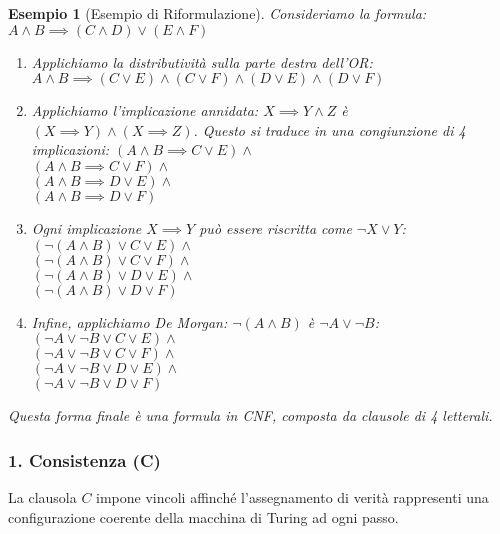 \documentclass[a4paper, 11pt]{book} %
\newtheorem{example}[theorem]{Esempio}
\theoremstyle{definition}
\begin{document}
\begin{example}[Esempio di Riformulazione]
Consideriamo la formula: $A \land B \implies (C \land D) \lor (E \land F)$
\begin{enumerate}
    \item Applichiamo la distributività sulla parte destra dell'OR:
    $A \land B \implies (C \lor E) \land (C \lor F) \land (D \lor E) \land (D \lor F)$
    \item Applichiamo l'implicazione annidata: $X \implies Y \land Z$ è $(X \implies Y) \land (X \implies Z)$.
    Questo si traduce in una congiunzione di 4 implicazioni:
    $(A \land B \implies C \lor E) \land$ \\
    $(A \land B \implies C \lor F) \land$ \\
    $(A \land B \implies D \lor E) \land$ \\
    $(A \land B \implies D \lor F)$
    \item Ogni implicazione $X \implies Y$ può essere riscritta come $\neg X \lor Y$:
    $(\neg (A \land B) \lor C \lor E) \land$ \\
    $(\neg (A \land B) \lor C \lor F) \land$ \\
    $(\neg (A \land B) \lor D \lor E) \land$ \\
    $(\neg (A \land B) \lor D \lor F)$
    \item Infine, applichiamo De Morgan: $\neg (A \land B)$ è $\neg A \lor \neg B$:
    $(\neg A \lor \neg B \lor C \lor E) \land$ \\
    $(\neg A \lor \neg B \lor C \lor F) \land$ \\
    $(\neg A \lor \neg B \lor D \lor E) \land$ \\
    $(\neg A \lor \neg B \lor D \lor F)$
\end{enumerate}
Questa forma finale è una formula in CNF, composta da clausole di 4 letterali.
\end{example}

\subsubsection{1. Consistenza (C)}
La clausola $C$ impone vincoli affinché l'assegnamento di verità rappresenti una configurazione coerente della macchina di Turing ad ogni passo.
\end{document}
